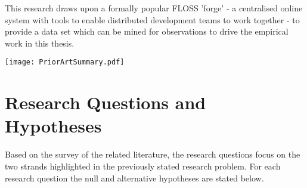 This research draws upon a formally popular FLOSS 'forge' - a centralised online system with tools to enable distributed development teams to work together - to provide a data set which can be mined for observations to drive the empirical work in this thesis.

\begin{table}
\begin{tabular}
 \centering
 \texttt{[image: PriorArtSummary.pdf]}
 \label{tab:PriorArtSummary}
\end{tabular}
\end{table}
\section{Research Questions and Hypotheses} %
Based on the survey of the related literature, the research questions focus on the two strands highlighted in the previously stated research problem. For each research question the null and alternative hypotheses are stated below.


